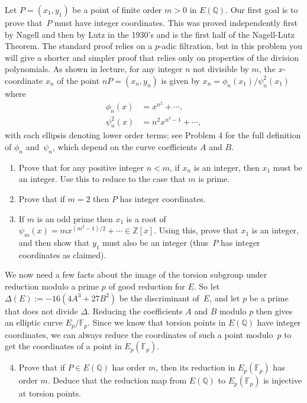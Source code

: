 \documentclass[11pt]{article}
\newcommand{\Fp}{\mathbb{F}_p}
\newcommand{\Q}{\mathbb{Q}}
\newcommand{\Z}{\mathbb{Z}}
\begin{document}
Let $P=(x_1,y_1)$ be a point of finite order $m>0$ in $E(\Q)$.
Our first goal is to prove that~$P$ must have integer coordinates.
This was proved independently first by Nagell \cite{nagell} and then by Lutz \cite{lutz} in the 1930's and is the first half of the Nagell-Lutz Theorem.
The standard proof \cite[\S 8.1]{washington} relies on a $p$-adic filtration, but in this problem you will give a shorter and simpler proof that relies only on properties of the division polynomials.
As shown in lecture, for any integer $n$ not divisible by $m$, the $x$-coordinate $x_n$ of the point $nP=(x_n,y_n)$ is given by $x_n=\phi_n(x_1)/\psi_n^2(x_1)$ where
\begin{align*}
\phi_n(x) &= x^{n^2} + \cdots,\\
\psi_n^2(x) &= n^2x^{n^2-1} + \cdots,
\end{align*}
with each ellipsis denoting lower order terms; see Problem 4 for the full definition of $\phi_n$ and~$\psi_n$, which depend on the curve coefficients $A$ and $B$.
\begin{enumerate}[{\bf (a)}]
\item Prove that for any positive integer $n<m$, if $x_n$ is an integer, then $x_1$ must be an integer.  Use this to reduce to the case that $m$ is prime.
\item Prove that if $m=2$ then $P$ has integer coordinates.
\item If $m$ is an odd prime then $x_1$ is a root of $\psi_m(x)=mx^{(m^2-1)/2}+\cdots\in \Z[x]$.  Using this, prove that $x_1$ is an integer, and then show that $y_1$ must also be an integer (thus~$P$ has integer coordinates as claimed).
\end{enumerate}

\noindent
We now need a few facts about the image of the torsion subgroup under reduction modulo a prime $p$ of good reduction for $E$.
So let $\Delta(E):=-16(4A^3+27B^2)$ be the discriminant of~$E$, and let $p$ be a prime that does not divide $\Delta$.
Reducing the coefficients $A$ and $B$ modulo $p$ then gives an elliptic curve $E_p/\Fp$.
Since we know that torsion points in $E(\Q)$ have integer coordinates, we can always reduce the coordinates of such a point modulo~$p$ to get the coordinates of a point in $E_p(\Fp)$.

\begin{enumerate}[{\bf (a)}]
\setcounter{enumi}{3}
\item Prove that if $P\in E(\Q)$ has order $m$, then its reduction in $E_p(\Fp)$ has order $m$.
Deduce that the reduction map from $E(\Q)$ to $E_p(\Fp)$ is injective at torsion points.
\end{enumerate}
\end{document}
